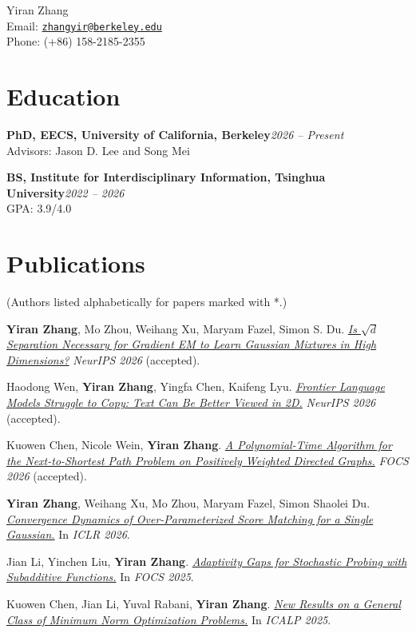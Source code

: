 \documentclass[10pt,a4paper]{article}
\newcommand{\publication}[1]{\item #1}
\begin{document}
\begin{center}
  {\Large Yiran Zhang}\\[3pt]
  Email: \href{mailto:zhangyir@berkeley.edu}{\texttt{zhangyir@berkeley.edu}}\\
  Phone: (+86) 158-2185-2355
\end{center}

\section*{Education}
\textbf{PhD, EECS, University of California, Berkeley}\hfill\textit{2026 -- Present}\\
Advisors: Jason D. Lee and Song Mei

\textbf{BS, Institute for Interdisciplinary Information, Tsinghua University}\hfill\textit{2022 -- 2026}\\
GPA: 3.9/4.0

\section*{Publications}
(Authors listed alphabetically for papers marked with *.)
\begin{enumerate}[label={[\arabic*]},leftmargin=0pt,itemindent=\parindent,labelwidth=0pt,labelsep=3pt,align=left,itemsep=6pt,topsep=2pt,parsep=0pt]
  \publication{\textbf{Yiran Zhang}, Mo Zhou, Weihang Xu, Maryam Fazel, Simon S. Du.
    \href{https://arxiv.org/abs/2610.07551}{\textit{Is $\sqrt{d}$ Separation Necessary for Gradient EM to Learn Gaussian Mixtures in High Dimensions?}}
    \textit{NeurIPS 2026} (accepted).}

  \publication{Haodong Wen, \textbf{Yiran Zhang}, Yingfa Chen, Kaifeng Lyu.
    \href{https://arxiv.org/abs/2607.16072}{\textit{Frontier Language Models Struggle to Copy: Text Can Be Better Viewed in 2D.}}
    \textit{NeurIPS 2026} (accepted).}

  \publication{* Kuowen Chen, Nicole Wein, \textbf{Yiran Zhang}.
    \href{https://arxiv.org/abs/2511.04345}{\textit{A Polynomial-Time Algorithm for the Next-to-Shortest Path Problem on Positively Weighted Directed Graphs.}}
    \textit{FOCS 2026} (accepted).}

  \publication{\textbf{Yiran Zhang}, Weihang Xu, Mo Zhou, Maryam Fazel, Simon Shaolei Du.
    \href{https://arxiv.org/abs/2511.22069}{\textit{Convergence Dynamics of Over-Parameterized Score Matching for a Single Gaussian.}}
    In \textit{ICLR 2026}.}

  \publication{* Jian Li, Yinchen Liu, \textbf{Yiran Zhang}.
    \href{https://arxiv.org/abs/2504.15547}{\textit{Adaptivity Gaps for Stochastic Probing with Subadditive Functions.}}
    In \textit{FOCS 2025}.}

  \publication{* Kuowen Chen, Jian Li, Yuval Rabani, \textbf{Yiran Zhang}.
    \href{https://arxiv.org/abs/2504.13489}{\textit{New Results on a General Class of Minimum Norm Optimization Problems.}}
    In \textit{ICALP 2025}.}
\end{enumerate}
\end{document}

